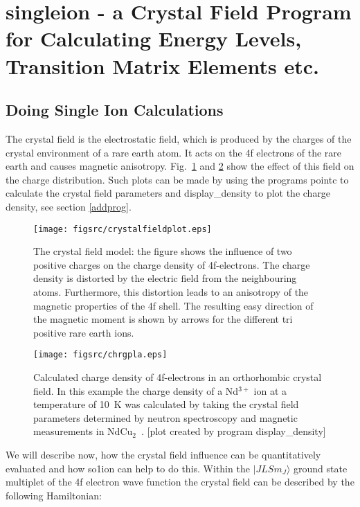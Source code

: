 \section{{\prg singleion} - a Crystal Field Program
for Calculating Energy Levels, Transition Matrix Elements etc.}\label{cfield}

\subsection{Doing Single Ion Calculations}
\label{cfieldsep}

The crystal field is the electrostatic field, which is produced by the
charges of the crystal environment of a rare earth atom. It acts on the
4f electrons of the rare earth and causes magnetic anisotropy. Fig.~\ref{chrgpla} and
\ref{chrgplb} show the effect of this field on the charge distribution.
Such plots can be made by using the programs {\prg pointc} to calculate
the crystal field parameters and
 {\prg display\_density} to plot the charge density, see section \ref{addprog}.

\begin{figure}[hb]
\texttt{[image: figsrc/crystalfieldplot.eps]}
\caption{\label{chrgpla}
The crystal field model: the figure shows the influence of two positive 
charges on the charge density of 4f-electrons. The
charge density is distorted by the electric field from the neighbouring atoms.
Furthermore, this distortion leads to an anisotropy of the magnetic properties
of the 4f shell. The resulting 
easy direction of the magnetic moment is shown by arrows for the different tri positive
rare earth ions.} 
\end{figure}

\begin{figure}[ht]
\texttt{[image: figsrc/chrgpla.eps]}
\caption{\label{chrgplb}
Calculated charge density of 4f-electrons in an orthorhombic crystal field. In
this example the charge density of a Nd$^{3+}$ ion at a temperature of 10~K was 
calculated by taking the crystal
field parameters determined by neutron spectroscopy and 
magnetic measurements in NdCu$_2$~\cite{gratz91-9297}.
[plot created by program {\prg display\_density}]}
\end{figure}

We will describe now, how the crystal field influence can be quantitatively evaluated
and how {\prg so1ion}  can help to do this.
Within the $|JLSm_J \rangle$ ground state multiplet of the 4f electron wave function 
the crystal field can be described by the following Hamiltonian:

